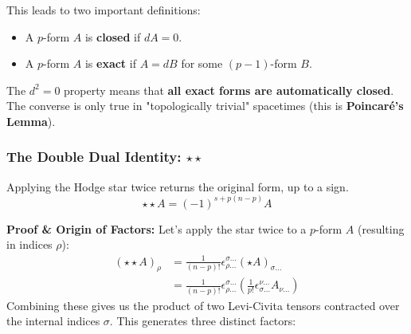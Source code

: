 \documentclass[11pt, a4paper]{report}
\begin{document}
This leads to two important definitions:
\begin{itemize}
    \item A $p$-form $A$ is \textbf{closed} if $dA=0$.
    \item A $p$-form $A$ is \textbf{exact} if $A=dB$ for some $(p-1)$-form $B$.
\end{itemize}
The $d^2=0$ property means that \textbf{all exact forms are automatically closed}. The converse is only true in "topologically trivial" spacetimes (this is \textbf{Poincaré's Lemma}).

\subsubsection*{The Double Dual Identity: $\star\star$}
Applying the Hodge star twice returns the original form, up to a sign.
\begin{equation}
    \star\star A = (-1)^{s + p(n-p)} A
\end{equation}

\textbf{Proof \& Origin of Factors:}
Let's apply the star twice to a $p$-form $A$ (resulting in indices $\rho$):
\begin{align*}
    (\star\star A)_{\rho} &= \frac{1}{(n-p)!} \epsilon^{\sigma \dots}_{\rho \dots} (\star A)_{\sigma \dots} \\
    &= \frac{1}{(n-p)!} \epsilon^{\sigma \dots}_{\rho \dots} \left( \frac{1}{p!} \epsilon^{\nu \dots}_{\sigma \dots} A_{\nu \dots} \right)
\end{align*}
Combining these gives us the product of two Levi-Civita tensors contracted over the internal indices $\sigma$. This generates three distinct factors:
\end{document}
